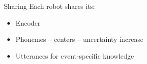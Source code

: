     \begin{frame}[allowframebreaks]{Sharing}
        Each robot shares its:
        \begin{itemize}
            \item Encoder
            \item Phonemes -- centers -- uncertainty increase
            \item Utterances for event-specific knowledge
        \end{itemize}
    \end{frame}